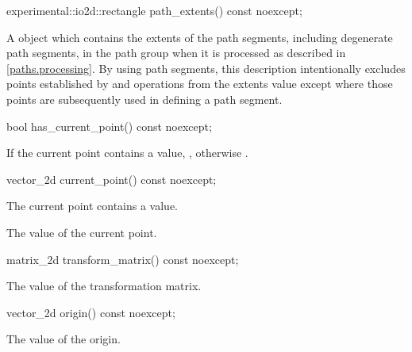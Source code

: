 \begin{itemdecl}
    experimental::io2d::rectangle path_extents() const noexcept;
\end{itemdecl}
\begin{itemdescr}
	\pnum
	\returns
	A  object which contains the extents of the path segments, including degenerate path segments, in the path group when it is processed as described in \ref{paths.processing}.
	\enternote
	By using path segments, this description intentionally excludes points established by  and  operations from the extents value except where those points are subsequently used in defining a path segment.
	\exitnote
\end{itemdescr}

\begin{itemdecl}
    bool has_current_point() const noexcept;
\end{itemdecl}
\begin{itemdescr}
	\pnum
	\returns
	If the current point contains a value, , otherwise .
\end{itemdescr}

\begin{itemdecl}
    vector_2d current_point() const noexcept;
\end{itemdecl}
\begin{itemdescr}
	\pnum
	\requires
	The current point contains a value.
	
	\pnum
	\returns
	The value of the current point.
\end{itemdescr}

\begin{itemdecl}
    matrix_2d transform_matrix() const noexcept;
\end{itemdecl}
\begin{itemdescr}
	\pnum
	\returns
	The value of the transformation matrix.
\end{itemdescr}

\begin{itemdecl}
    vector_2d origin() const noexcept;
\end{itemdecl}
\begin{itemdescr}
	\pnum
	\returns
	The value of the origin.
\end{itemdescr}

